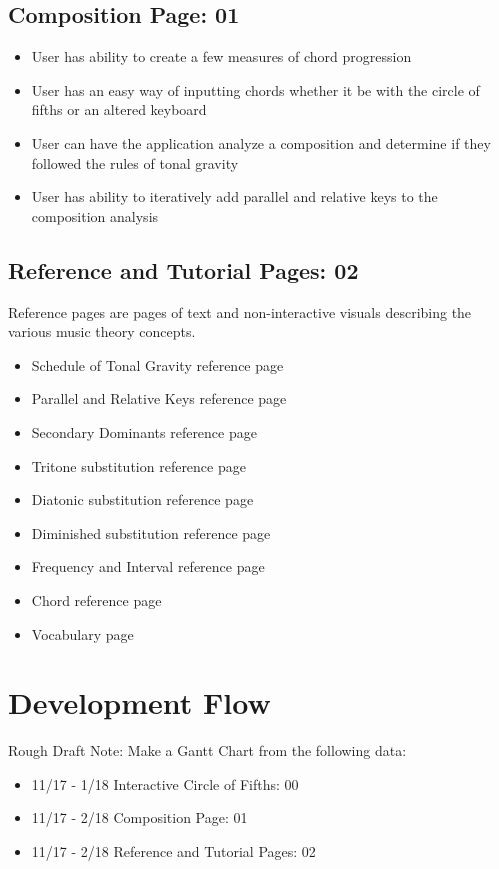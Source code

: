 \documentclass[onecolumn, draftclsnofoot,10pt, compsoc]{IEEEtran}
\begin{document}
\subsection{Composition Page: 01}
\begin{itemize}
\item User has ability to create a few measures of chord progression
\item User has an easy way of inputting chords whether it be with the circle of fifths or an altered keyboard
\item User can have the application analyze a composition and determine if they followed the rules of tonal gravity
\item User has ability to iteratively add parallel and relative keys to the composition analysis
\end{itemize}

\pagebreak
\subsection{Reference and Tutorial Pages: 02}
Reference pages are pages of text and non-interactive visuals describing the various music theory concepts.
\begin{itemize}
\item Schedule of Tonal Gravity reference page
\item Parallel and Relative Keys reference page
\item Secondary Dominants reference page
\item Tritone substitution reference page
\item Diatonic substitution reference page
\item Diminished substitution reference page
\item Frequency and Interval reference page 
\item Chord reference page
\item Vocabulary page
\end{itemize}

\section{Development Flow}

Rough Draft Note: Make a Gantt Chart from the following data:

\begin{itemize}
\item 11/17 - 1/18 Interactive Circle of Fifths: 00
\item 11/17 - 2/18 Composition Page: 01
\item 11/17 - 2/18 Reference and Tutorial Pages: 02
\end{itemize}
\end{document}
